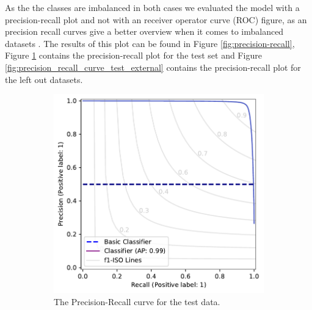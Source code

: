 \documentclass[a4paper, 12pt, oneside]{book} %
\begin{document}
As the the classes are imbalanced in both cases we  evaluated the model with a precision-recall plot and not with an receiver operator curve (ROC) figure, as an precision recall curves give a better overview when it comes to imbalanced datasets \autocite{saito_precision-recall_2015}.
The results of this plot can be found in Figure \ref{fig:precision-recall}, Figure \ref{fig:precision_recall_curve_test} contains the precision-recall plot for the test set and Figure \ref{fig:precision_recall_curve_test_external} contains the precision-recall plot for the left out datasets.
\begin{figure} [htpb]
     \centering
     \begin{subfigure}[b]{0.49\textwidth}
         \centering
         \includegraphics[width=\textwidth]{precision_recall_plot.pdf}
         \caption{The Precision-Recall curve for the test data.}
         \label{fig:precision_recall_curve_test}
     \end{subfigure}
     \hfill
     \begin{subfigure}[b]{0.49\textwidth}
         \centering

\end{subfigure}
\end{figure}
\end{document}

